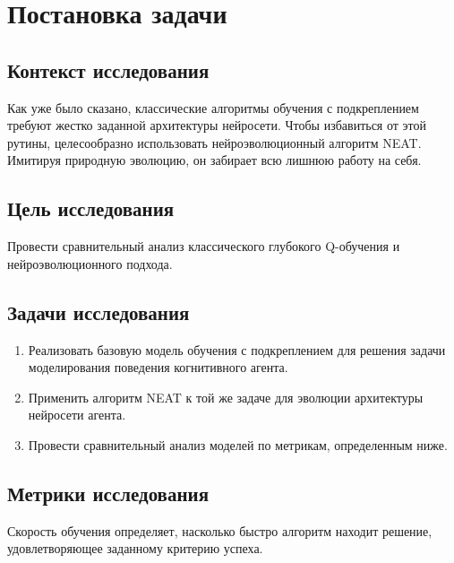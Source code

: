 \section{Постановка задачи}

\subsection{Контекст исследования}

Как уже было сказано, классические алгоритмы обучения с подкреплением требуют жестко заданной архитектуры нейросети. Чтобы избавиться от этой рутины, целесообразно использовать нейроэволюционный алгоритм NEAT. Имитируя природную эволюцию, он забирает всю лишнюю работу на себя.

\subsection{Цель исследования}

Провести сравнительный анализ классического глубокого Q-обучения и нейроэволюционного подхода.

\subsection{Задачи исследования}

\begin{enumerate}

  \item Реализовать базовую модель обучения с подкреплением для решения задачи моделирования поведения когнитивного агента.

  \item Применить алгоритм NEAT к той же задаче для эволюции архитектуры нейросети агента.

  \item Провести сравнительный анализ моделей по метрикам, определенным ниже.
  
\end{enumerate}

\subsection{Метрики исследования}

\begin{definition}
  \label{def:learning_efficiency}
  Скорость обучения определяет, насколько быстро алгоритм находит решение, удовлетворяющее заданному критерию успеха.
\end{definition}

